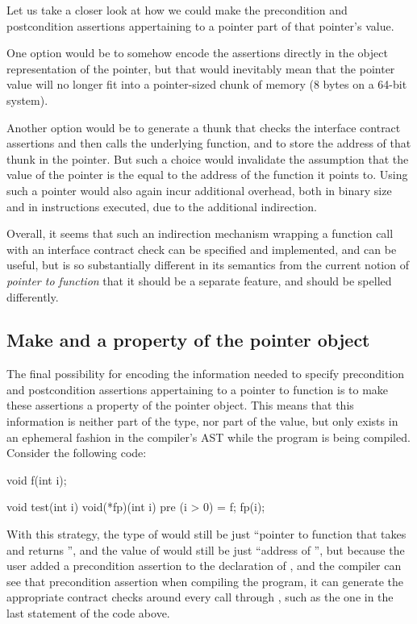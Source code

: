 Let us take a closer look at how we could make the precondition and postcondition assertions appertaining to a pointer part of that pointer's value.

One option would be to somehow encode the assertions directly in the object representation of the pointer, but that would inevitably mean that the pointer value will no longer fit into a pointer-sized chunk of memory (8 bytes on a 64-bit system).

Another option would be to generate a thunk that checks the interface contract assertions and then calls the underlying function, and to store the address of that thunk in the pointer. But such a choice would invalidate the assumption that the value of the pointer is the equal to the address of the function it points to. Using such a pointer would also again incur additional overhead, both in binary size and in instructions executed, due to the additional indirection.

Overall, it seems that such an indirection mechanism wrapping a function call with an interface contract check can be specified and implemented, and can be useful, but is so substantially different in its semantics from the current notion of \emph{pointer to function} that it should be a separate feature, and should be spelled differently.

\subsection{Make  and  a property of the pointer object}

The final possibility for encoding the information needed to specify precondition and postcondition assertions appertaining to a pointer to function is to make these assertions a property of the pointer object. This means that this information is neither part of the type, nor part of the value, but only exists in an ephemeral fashion in the compiler's AST while the program is being compiled. Consider the following code:
\begin{codeblock}
void f(int i);

void test(int i) {
  void(*fp)(int i) pre (i > 0) = f;
  fp(i);
}
\end{codeblock}
With this strategy, the type of  would still be just ``pointer to function that takes  and returns '', and the value of  would still be just ``address of '', but because the user added a precondition assertion to the declaration of , and the compiler can see that precondition assertion when compiling the program, it can generate the appropriate contract checks around every call through , such as the one in the last statement of the code above.

